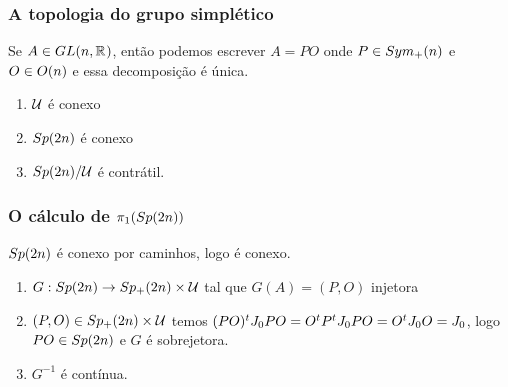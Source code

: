 \documentclass{beamer}
\begin{document}
	\begin{frame}
		\frametitle{A topologia do grupo simplético}
		
		\begin{teorema}
			 Se $A \in GL(n, \mathbb{R}^{})$, então podemos escrever $A=PO$ onde $P \in  Sym_{+}(n)$ e $O \in O(n)$ e essa decomposição é única.
		\end{teorema}
		\begin{enumerate}
			\item $\mathcal{U}$ é conexo
			
			\item $Sp(2n)$ é conexo
			
			\item $Sp(2n)/\mathcal{U}$ é contrátil.
		\end{enumerate}
	\end{frame}
	
	\begin{frame}
		\frametitle{O cálculo de $\pi_{1}(Sp(2n))$}
		\begin{teorema}\label{teoerma_sp2n_conexo}
			$Sp(2n)$ é conexo por caminhos, logo é conexo.
		\end{teorema}
		
		\begin{prova}
			\begin{enumerate}
				\item $G: Sp(2n) \to Sp_{+}(2n) \times \mathcal{U}$ tal que $G(A) = (P,O)$ injetora
				
				\pause
				\item $(P,O) \in Sp_{+}(2n) \times \mathcal{U}$ temos $(PO)^{t}J_{0} PO = O^{t}P^{t}J_{0} PO = O^{t}J_{0} O = J_{0}$, logo $PO \in Sp(2n)$ e $G$ é sobrejetora.
				
				\pause
				\item $G^{-1}$ é contínua.
			\end{enumerate}
		\end{prova}
	\end{frame}
	
\end{document}
